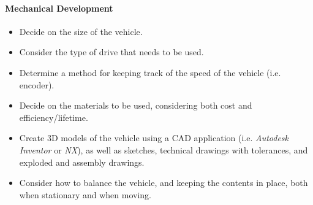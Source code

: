\documentclass[11pt]{article}
\begin{document}
\paragraph{Mechanical Development}
\begin{itemize}
\item{Decide on the size of the vehicle.}
\item{Consider the type of drive that needs to be used.}
\item{Determine a method for keeping track of the speed of the vehicle (i.e. encoder).}
\item{Decide on the materials to be used, considering both cost and efficiency/lifetime.}
\item{Create 3D models of the vehicle using a CAD application (i.e. \textit{Autodesk Inventor} or \textit{NX}), as well as sketches, technical drawings with tolerances, and exploded and assembly drawings.}
\item{Consider how to balance the vehicle, and keeping the contents in place, both when stationary and when moving.}
\end{itemize}
\end{document}
